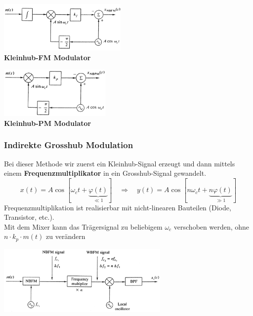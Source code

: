 \begin{minipage}[t][2.5cm][c]{9cm}	
	\begin{center}
  		\includegraphics[height=2.5cm]{bilder/fm_nbfm_modulator.png} \\
  		\textbf{Kleinhub-FM Modulator}
	\end{center}
\end{minipage}
\begin{minipage}[t][2.5cm][c]{9cm} 
	\begin{center}
		\includegraphics[height=2.5cm]{bilder/fm_nbpm_modulator.png} \\ 
  		\textbf{Kleinhub-PM Modulator}
	\end{center}
\end{minipage}

\subsubsection{Indirekte Grosshub Modulation }
\begin{minipage}[t][4cm][c]{10cm}	
	Bei dieser Methode wir zuerst ein Kleinhub-Signal erzeugt und dann mittels einem
	\textbf{Frequenzmultiplikator} in ein Grosshub-Signal gewandelt.
	$$ x(t) = A \cos[\omega_c t + \underbrace{\varphi(t)}_{\ll 1}] \quad \Rightarrow \quad y(t) = A \cos[n \omega _c t + \underbrace{n\varphi(t)}_{\gg 1}]$$ 
	Frequenzmultiplikation ist realisierbar mit nicht-linearen Bauteilen (Diode, Transistor,
	etc.).\\
	Mit dem Mixer kann das Tr\"agersignal zu beliebigem $\omega_c$ verschoben werden, ohne $n\cdot k_p \cdot m(t)$ zu ver\"andern
\end{minipage}
\begin{minipage}[t][3cm][c]{8.5cm} 
	\begin{center}
		\includegraphics[height=3.4cm]{bilder/fm_nbfm2wbfmConverter.png}
	\end{center}
\end{minipage}

